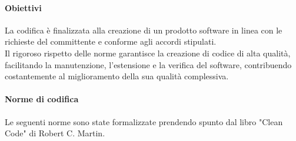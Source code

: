 \paragraph{Obiettivi}
La codifica è finalizzata alla creazione di un prodotto software in linea con le richieste del committente e conforme agli accordi stipulati.\\
Il rigoroso rispetto delle norme garantisce la creazione di codice di alta qualità, facilitando la manutenzione, l'estensione e la verifica del software, contribuendo costantemente al miglioramento della sua qualità complessiva.
\paragraph{Norme di codifica}
Le seguenti norme sono state formalizzate prendendo spunto dal libro "Clean Code" di Robert C. Martin.

